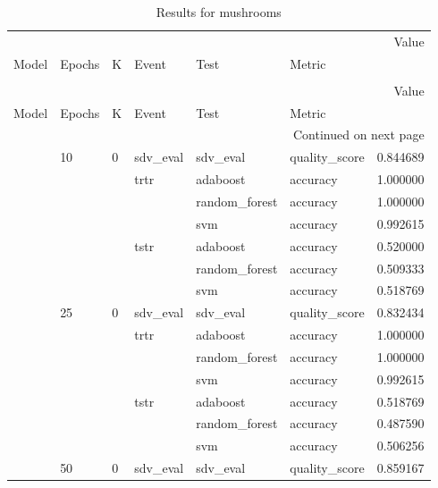\begin{longtable}{llllllr}
\caption{Results for mushrooms} \\
\toprule
 &  &  &  &  &  & Value \\
Model & Epochs & K & Event & Test & Metric &  \\
\midrule
\endfirsthead
\caption[]{Results for mushrooms} \\
\toprule
 &  &  &  &  &  & Value \\
Model & Epochs & K & Event & Test & Metric &  \\
\midrule
\endhead
\midrule
\multicolumn{7}{r}{Continued on next page} \\
\midrule
\endfoot
\bottomrule
\endlastfoot
\multirow[t]{35}{*}{CTGAN} & \multirow[t]{7}{*}{10} & \multirow[t]{7}{*}{0} & sdv_eval & sdv_eval & quality_score & 0.844689 \\
\cline{4-7} \cline{5-7}
 &  &  & \multirow[t]{3}{*}{trtr} & adaboost & accuracy & 1.000000 \\
\cline{5-7}
 &  &  &  & random_forest & accuracy & 1.000000 \\
\cline{5-7}
 &  &  &  & svm & accuracy & 0.992615 \\
\cline{4-7} \cline{5-7}
 &  &  & \multirow[t]{3}{*}{tstr} & adaboost & accuracy & 0.520000 \\
\cline{5-7}
 &  &  &  & random_forest & accuracy & 0.509333 \\
\cline{5-7}
 &  &  &  & svm & accuracy & 0.518769 \\
\cline{2-7} \cline{3-7} \cline{4-7} \cline{5-7}
 & \multirow[t]{7}{*}{25} & \multirow[t]{7}{*}{0} & sdv_eval & sdv_eval & quality_score & 0.832434 \\
\cline{4-7} \cline{5-7}
 &  &  & \multirow[t]{3}{*}{trtr} & adaboost & accuracy & 1.000000 \\
\cline{5-7}
 &  &  &  & random_forest & accuracy & 1.000000 \\
\cline{5-7}
 &  &  &  & svm & accuracy & 0.992615 \\
\cline{4-7} \cline{5-7}
 &  &  & \multirow[t]{3}{*}{tstr} & adaboost & accuracy & 0.518769 \\
\cline{5-7}
 &  &  &  & random_forest & accuracy & 0.487590 \\
\cline{5-7}
 &  &  &  & svm & accuracy & 0.506256 \\
\cline{2-7} \cline{3-7} \cline{4-7} \cline{5-7}
 & \multirow[t]{7}{*}{50} & \multirow[t]{7}{*}{0} & sdv_eval & sdv_eval & quality_score & 0.859167 \\
\cline{4-7} \cline{5-7}

\end{longtable}
